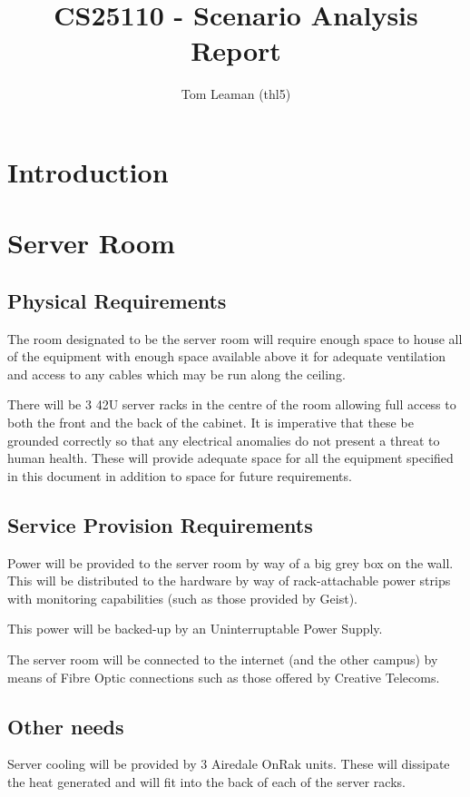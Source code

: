 \documentclass[a4paper, twoside]{article}
\title{CS25110 - Scenario Analysis Report}
\author{Tom Leaman (thl5)}
\begin{document}
\maketitle
\newpage
\tableofcontents
\newpage

\section{Introduction}

\section{Server Room}
\subsection{Physical Requirements}
The room designated to be the server room will require enough space to house all
of the equipment with enough space available above it for adequate ventilation
and access to any cables which may be run along the ceiling.

There will be 3 42U server racks in the centre of the room allowing full access
to both the front and the back of the cabinet. It is imperative that these be
grounded correctly so that any electrical anomalies do not present a threat to
human health. These will provide adequate space for all the equipment specified
in this document in addition to space for future requirements.

\subsection{Service Provision Requirements}
Power will be provided to the server room by way of a big grey box on the wall.
This will be distributed to the hardware by way of rack-attachable power strips
with monitoring capabilities (such as those provided by Geist).

This power will be backed-up by an Uninterruptable Power Supply. %

The server room will be connected to the internet (and the other campus) by
means of Fibre Optic connections such as those offered by Creative Telecoms.

\subsection{Other needs}
Server cooling will be provided by 3 Airedale OnRak units. These will dissipate
the heat generated and will fit into the back of each of the server racks.
\end{document}
